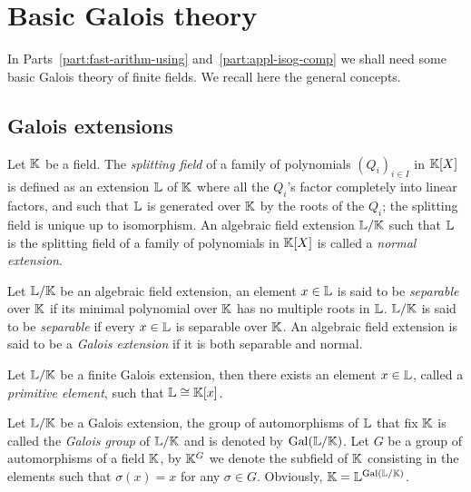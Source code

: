\section{Basic Galois theory}
\label{sec:basic-galois-theory}
In Parts~\ref{part:fast-arithm-using} and~\ref{part:appl-isog-comp} we
shall need some basic Galois theory of finite fields. We recall here
the general concepts.

\subsection{Galois extensions}
\label{sec:basic-galois-theory:galois-extensions}
 Let $\mathbb{K}$ be a
field. The \emph{splitting field} of a family
of polynomials $(Q_i)_{i\in I}$ in $\mathbb{K}[X]$ is defined as an extension
$\mathbb{L}$ of $\mathbb{K}$ where all the $Q_i$'s factor completely into linear
factors, and such that $\mathbb{L}$ is generated over $\mathbb{K}$ by the roots of
the $Q_i$; the splitting field is unique up to isomorphism. An
algebraic field extension $\mathbb{L}/\mathbb{K}$ such that $\mathbb{L}$ is the splitting
field of a family of polynomials in $\mathbb{K}[X]$ is called a
\emph{normal extension}.

Let $\mathbb{L}/\mathbb{K}$ be an algebraic field extension, an element $x\in\mathbb{L}$ is
said to be \emph{separable} over $\mathbb{K}$ if
its minimal polynomial over $\mathbb{K}$ has no multiple roots in $\mathbb{L}$.
$\mathbb{L}/\mathbb{K}$ is said to be 
\emph{separable} if every $x\in\mathbb{L}$ is separable over $\mathbb{K}$. An
algebraic field extension is said to be a
\emph{Galois extension} if it is both
separable and normal.

\begin{theorem}
  Let $\mathbb{L}/\mathbb{K}$ be a finite Galois extension, then there exists an
  element $x\in\mathbb{L}$, called a
  \emph{primitive element}, such that
  $\mathbb{L}\cong\mathbb{K}[x]$.
\end{theorem}

Let $\mathbb{L}/\mathbb{K}$ be a Galois extension, the group of automorphisms of
$\mathbb{L}$ that fix $\mathbb{K}$ is called the \emph{Galois
  group} of $\mathbb{L}/\mathbb{K}$ and is denoted by
$\operatorname{Gal}(\mathbb{L}/\mathbb{K})$.  Let
$G$ be a group of automorphisms of a field $\mathbb{K}$, by
$\mathbb{K}^G$ we denote the subfield of $\mathbb{K}$
consisting in the elements such that $\sigma(x)=x$ for any $\sigma\in
G$. Obviously, $\mathbb{K}=\mathbb{L}^{\operatorname{Gal}(\mathbb{L}/\mathbb{K})}$.

